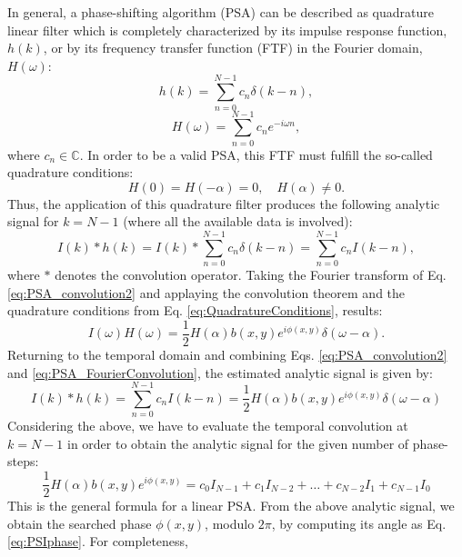 In general, a phase-shifting algorithm (PSA) can be described as quadrature linear
filter which is completely characterized by its impulse response function, $h(k)$,
or by its frequency transfer function (FTF) in the Fourier domain, $H(\omega)$:
\begin{equation}
 h(k)=\sum^{N-1}_{n=0} c_n \delta(k-n),
\end{equation}
\begin{equation}
 H(\omega)=\sum^{N-1}_{n=0} c_n e^{-i\omega n},
\end{equation}
where ${c_n} \in \mathbb{C}$. In order to be a valid PSA, this FTF must fulfill
the so-called quadrature conditions:
\begin{equation}\label{eq:QuadratureConditions}
 H(0)=H(-\alpha)=0, \quad H(\alpha)\not=0.
\end{equation}
Thus, the application of this quadrature filter produces the following analytic
signal for $k = N-1$ (where all the available data is involved):
\begin{equation}\label{eq:PSA_convolution2}
 I(k)*h(k)=I(k)*\sum^{N-1}_{n=0} c_n \delta(k-n) = \sum^{N-1}_{n=0} c_n I(k-n),
\end{equation}
where $*$ denotes the convolution operator. Taking the Fourier transform of Eq. 
\eqref{eq:PSA_convolution2} and applaying the convolution theorem and the 
quadrature conditions from Eq. \eqref{eq:QuadratureConditions}, results:
\begin{equation}\label{eq:PSA_FourierConvolution}
 I(\omega)H(\omega)= \frac{1}{2} H(\alpha)b(x,y) e^{i\phi(x,y)} \delta(\omega-\alpha).
\end{equation}
Returning to the temporal domain and combining Eqs. 
\eqref{eq:PSA_convolution2} and \eqref{eq:PSA_FourierConvolution}, the estimated 
analytic 
signal is given by:
\begin{equation}
 I(k)*h(k)= \sum^{N-1}_{n=0} c_n I(k-n) = \frac{1}{2} H(\alpha)b(x,y) e^{i\phi(x,y)} 
  \delta(\omega-\alpha)
\end{equation}
Considering the above, we have to evaluate the temporal convolution at $k=N-1$ in
order to obtain the analytic signal for the given number of phase-steps:
\begin{equation}
  \frac{1}{2} H(\alpha)b(x,y) e^{i\phi(x,y)} = c_0 I_{N-1} + c_1 I_{N-2}+ \dots 
  + c_{N-2} I_{1}+ c_{N-1} I_{0}
\end{equation}
This is the general formula for a linear PSA.
From the above analytic signal, we obtain the searched phase $\phi(x,y)$, modulo
$2\pi$, by computing its angle as Eq. \eqref{eq:PSIphase}. For completeness, 
